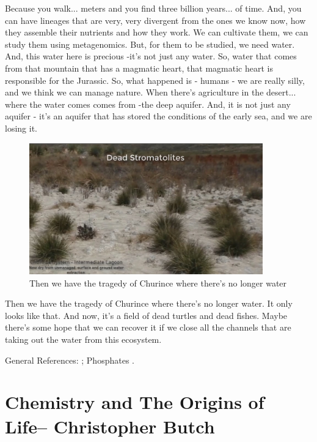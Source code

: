 \documentclass[]{article}
\begin{document}
Because you walk... meters and you find three billion years... of time. And, you can have lineages that are very, very divergent from the ones we know now, how they assemble their nutrients and how they work. We can cultivate them, we can study them using metagenomics. But, for them to be studied, we need water. And, this water here is precious -it's not just any water. So, water that comes from that mountain that has a magmatic heart, that magmatic heart is responsible for the Jurassic. So, what happened is - humans - we are really silly, and we think we can manage nature. When there's agriculture in the desert... where the water comes comes from -the deep aquifer. And, it is not just any aquifer - it's an aquifer that has stored the conditions of the early sea, and we are losing it.

\begin{figure}[H]
	\caption[The tragedy of Churince where there's no longer water]{Then we have the tragedy of Churince where there's no longer water} 
	\includegraphics[width=0.9\textwidth]{CuatroCienegas11}
\end{figure}

Then we have the tragedy of Churince where there's no longer water. It only looks like that. And now, it's a field of dead turtles and dead fishes. Maybe there's some hope that we can recover it if we close all the channels that are taking out the water from this ecosystem.

General References:  \cite{gomez2018leptolyngbya,taboada2018geographic}; Phosphates \cite{hao2020cycling,elser2006early}.

\section[Chemistry and The Origins of Life]{Chemistry and The Origins of Life-- Christopher Butch}
\end{document}
